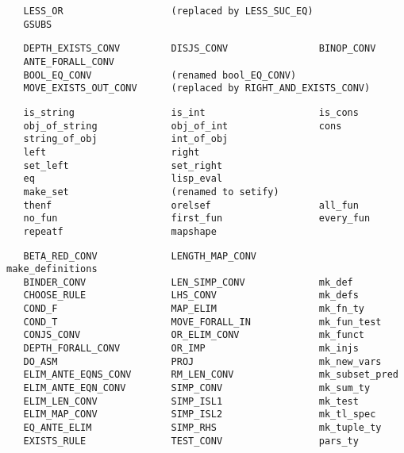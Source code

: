 \begin{hol}\begin{verbatim}
   LESS_OR                   (replaced by LESS_SUC_EQ)
   GSUBS
\end{verbatim}\end{hol}
\begin{hol}\begin{verbatim}
   DEPTH_EXISTS_CONV         DISJS_CONV                BINOP_CONV
   ANTE_FORALL_CONV
   BOOL_EQ_CONV              (renamed bool_EQ_CONV)
   MOVE_EXISTS_OUT_CONV      (replaced by RIGHT_AND_EXISTS_CONV)
\end{verbatim}\end{hol}
\begin{hol}\begin{verbatim}
   is_string                 is_int                    is_cons
   obj_of_string             obj_of_int                cons
   string_of_obj             int_of_obj
   left                      right
   set_left                  set_right
   eq                        lisp_eval
   make_set                  (renamed to setify)
   thenf                     orelsef                   all_fun
   no_fun                    first_fun                 every_fun
   repeatf                   mapshape
 \end{verbatim}\end{hol}
\begin{hol}\begin{verbatim}
   BETA_RED_CONV             LENGTH_MAP_CONV           make_definitions
   BINDER_CONV               LEN_SIMP_CONV             mk_def
   CHOOSE_RULE               LHS_CONV                  mk_defs
   COND_F                    MAP_ELIM                  mk_fn_ty
   COND_T                    MOVE_FORALL_IN            mk_fun_test
   CONJS_CONV                OR_ELIM_CONV              mk_funct
   DEPTH_FORALL_CONV         OR_IMP                    mk_injs
   DO_ASM                    PROJ                      mk_new_vars
   ELIM_ANTE_EQNS_CONV       RM_LEN_CONV               mk_subset_pred
   ELIM_ANTE_EQN_CONV        SIMP_CONV                 mk_sum_ty
   ELIM_LEN_CONV             SIMP_ISL1                 mk_test
   ELIM_MAP_CONV             SIMP_ISL2                 mk_tl_spec
   EQ_ANTE_ELIM              SIMP_RHS                  mk_tuple_ty
   EXISTS_RULE               TEST_CONV                 pars_ty
\end{verbatim}\end{hol}
